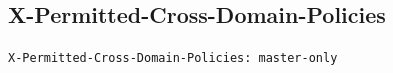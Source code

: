\documentclass[12pt,DIV14,BCOR10mm,a4paper,twoside,parskip=half-,headsepline,headinclude,english,ngerman,bibliography=totocnumbered]{scrreprt}
\begin{document}
\subsection{X-Permitted-Cross-Domain-Policies}
\texttt{X-Permitted-Cross-Domain-Policies: master-only}\newline

\printacronyms[title=Abkürzungsverzeichnis,toctitle=Abkürzungsverzeichnis]
\printglossary[type=main]

\listoffigures      %

\end{document}

